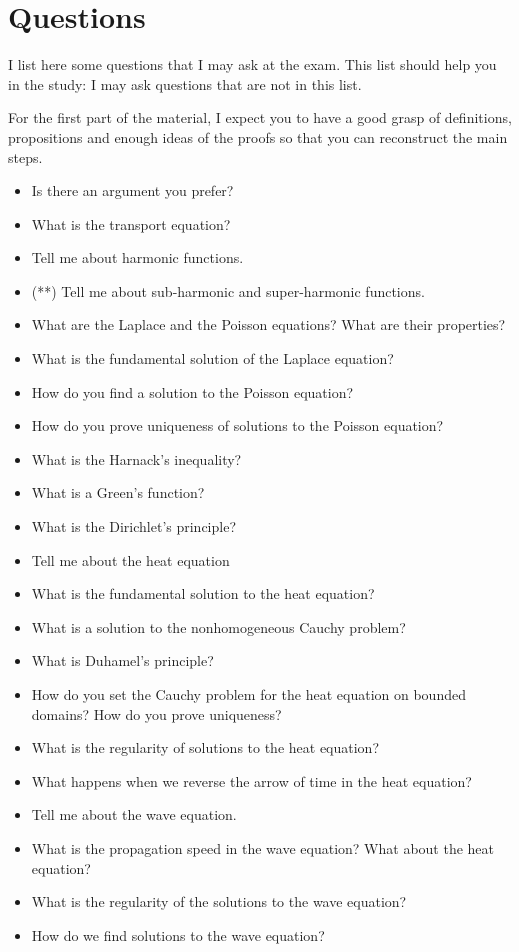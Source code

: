 \documentclass[a4paper,9pt]{amsart}
\theoremstyle{plain}
\theoremstyle{definition}
\theoremstyle{remark}
\begin{document}
\section{Questions}
I list here some questions that I may ask at the exam.
This list should help you in the study: I may ask questions that are not in this list.

For the first part of the material, I expect you to have a good grasp of definitions, propositions and enough ideas of the proofs so that you can reconstruct the main steps.

\begin{itemize}
\item
Is there an argument you prefer?
\item
What is the transport equation?
\item
Tell me about harmonic functions.
\item
(**) Tell me about sub-harmonic and super-harmonic functions.
\item
What are the Laplace and the Poisson equations? What are their properties?
\item 
What is the fundamental solution of the Laplace equation?
\item
How do you find a solution to the Poisson equation?
\item
How do you prove uniqueness of solutions to the Poisson equation?
\item
What is the Harnack's inequality?
\item
What is a Green's function?
\item
What is the Dirichlet's principle?
\item
Tell me about the heat equation
\item
What is the fundamental solution to the heat equation?
\item
What is a solution to the nonhomogeneous Cauchy problem?
\item
What is Duhamel's principle?
\item
How do you set the Cauchy problem for the heat equation on bounded domains? How do you prove uniqueness?
\item
What is the regularity of solutions to the heat equation?
\item
What happens when we reverse the arrow of time in the heat equation?
\item
Tell me about the wave equation.
\item
What is the propagation speed in the wave equation? What about the heat equation?
\item
What is the regularity of the solutions to the wave equation?
\item
How do we find solutions to the wave equation?
\end{itemize}
\end{document}
